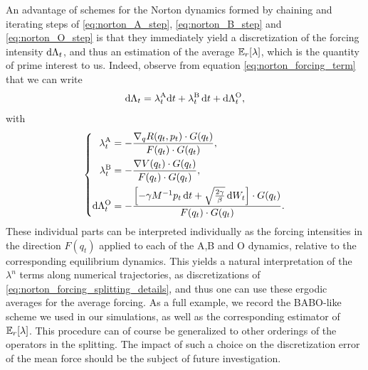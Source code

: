 An advantage of schemes for the Norton dynamics formed by chaining and iterating steps of \eqref{eq:norton_A_step}, \eqref{eq:norton_B_step} and \eqref{eq:norton_O_step} 
is that they immediately yield a discretization of the forcing intensity $\mathrm{d}\Lambda_t$, and thus an estimation of the average $\mathbb{E}_r[\lambda]$, which is the quantity of prime interest to us.
Indeed, observe from equation \eqref{eq:norton_forcing_term} that we can write
\begin{equation}
    \label{eq:norton_forcing_splitting}
    \mathrm{d} \Lambda_t = \lambda^{\mathrm{A}}_t \mathrm{d} t + \lambda^{\mathrm{B}}_t\,\mathrm{d} t + \mathrm{d} \Lambda_t^{\mathrm{O}},
\end{equation}
with 
\begin{equation}
    \label{eq:norton_forcing_splitting_details}
    \left\{
    \begin{aligned}
        \lambda^{\mathrm{A}}_t &= -\frac{\nabla_q R(q_t,p_t)\cdot G(q_t)}{F(q_t)\cdot G(q_t)},\\
        \lambda^{\mathrm{B}}_t &= -\frac{\nabla V(q_t)\cdot G(q_t)}{F(q_t)\cdot G(q_t)},\\
        \mathrm{d} \Lambda_t^{\mathrm{O}} &= -\frac{\left[-\gamma M^{-1}p_t\,\mathrm{d} t +\sqrt{\frac{2\gamma}\beta}\,\mathrm{d} W_t \right]\cdot G(q_t)}{F(q_t)\cdot G(q_t)}.
    \end{aligned}
    \right.
\end{equation}
These individual parts can be interpreted individually as the forcing intensities in the direction $F(q_t)$ applied to each of the A,B and O dynamics, relative to the corresponding equilibrium dynamics.
This yields a natural interpretation of the $\lambda^n$ terms along numerical trajectories, as discretizations of \eqref{eq:norton_forcing_splitting_details}, 
and thus one can use these ergodic averages for the average forcing. As a full example, we record the BABO-like scheme we used in our simulations, as well as the corresponding estimator of $\mathbb{E}_r[\lambda]$.
This procedure can of course be generalized to other orderings of the operators in the splitting. The impact of such a choice on the discretization error of the mean force should be the subject of future investigation.

